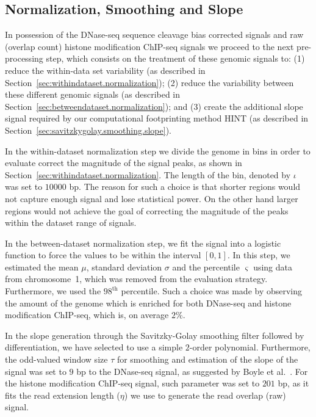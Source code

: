 \subsection{Normalization, Smoothing and Slope}
\label{sec:normalization.smoothing.slope}

In possession of the DNase-seq sequence cleavage bias corrected signals and raw (overlap count) histone modification ChIP-seq signals we proceed to the next pre-processing step, which consists on the treatment of these genomic signals to: (1) reduce the within-data set variability (as described in Section~\ref{sec:withindataset.normalization}); (2) reduce the variability between these different genomic signals (as described in Section~\ref{sec:betweendataset.normalization}); and (3) create the additional slope signal required by our computational footprinting method HINT (as described in Section~\ref{sec:savitzkygolay.smoothing.slope}).

In the within-dataset normalization step we divide the genome in bins in order to evaluate correct the magnitude of the signal peaks, as shown in Section~\ref{sec:withindataset.normalization}. The length of the bin, denoted by $\iota$ was set to $10000$ bp. The reason for such a choice is that shorter regions would not capture enough signal and lose statistical power. On the other hand larger regions would not achieve the goal of correcting the magnitude of the peaks within the dataset range of signals.

In the between-dataset normalization step, we fit the signal into a logistic function to force the values to be within the interval $[0,1]$. In this step, we estimated the mean $\mu$, standard deviation $\sigma$ and the percentile $\varsigma$ using data from chromosome~1, which was removed from the evaluation strategy. Furthermore, we used the $98^\text{th}$ percentile. Such a choice was made by observing the amount of the genome which is enriched for both DNase-seq and histone modification ChIP-seq, which is, on average \approxy$2\%$.

In the slope generation through the Savitzky-Golay smoothing filter followed by differentiation, we have selected to use a simple $2$-order polynomial. Furthermore, the odd-valued window size $\tau$ for smoothing and estimation of the slope of the signal was set to $9$ bp to the DNase-seq signal, as suggested by Boyle et al.~\cite{boyle2011}. For the histone modification ChIP-seq signal, such parameter was set to $201$ bp, as it fits the read extension length ($\eta$) we use to generate the read overlap (raw) signal.

